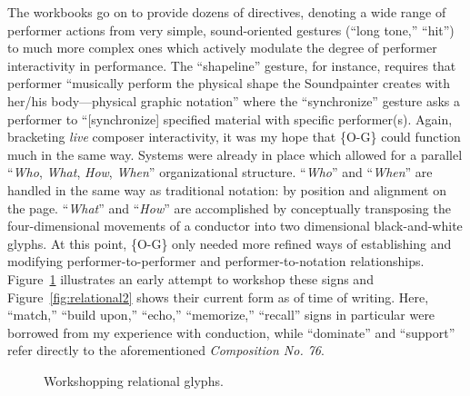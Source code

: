     The workbooks go on to provide dozens of directives, denoting a wide range of performer actions from very simple, sound-oriented gestures (``long tone,'' ``hit'') to much more complex ones which actively modulate the degree of performer interactivity in performance. The ``shapeline'' gesture, for instance, requires that performer ``musically perform the physical shape the Soundpainter creates with her/his body---physical graphic notation'' where the ``synchronize'' gesture asks a performer to ``[synchronize] specified material with specific performer(s).\autocite[34--5]{Thompson_2006_1} Again, bracketing \textit{live} composer interactivity, it was my hope that \{O-G\} could function much in the same way. Systems were already in place which allowed for a parallel ``\textit{Who}, \textit{What}, \textit{How}, \textit{When}'' organizational structure. ``\textit{Who}'' and ``\textit{When}'' are handled in the same way as traditional notation: by position and alignment on the page. ``\textit{What}'' and ``\textit{How}'' are accomplished by conceptually transposing the four-dimensional movements of a conductor into two dimensional black-and-white glyphs. At this point, \{O-G\} only needed more refined ways of establishing and modifying performer-to-performer and performer-to-notation relationships. Figure~\ref{fig:relational1} illustrates an early attempt to workshop these signs and Figure~\ref{fig:relational2} shows their current form as of time of writing. Here, ``match,'' ``build upon,'' ``echo,'' ``memorize,'' ``recall'' signs in particular were borrowed from my experience with conduction, while ``dominate'' and ``support'' refer directly to the aforementioned \textit{Composition No. 76}.

        \begin{figure}
            \centering
            \captionsetup{width=.5\textwidth} 
            \caption{Workshopping relational glyphs.}
            \label{fig:relational1}
        \end{figure}

